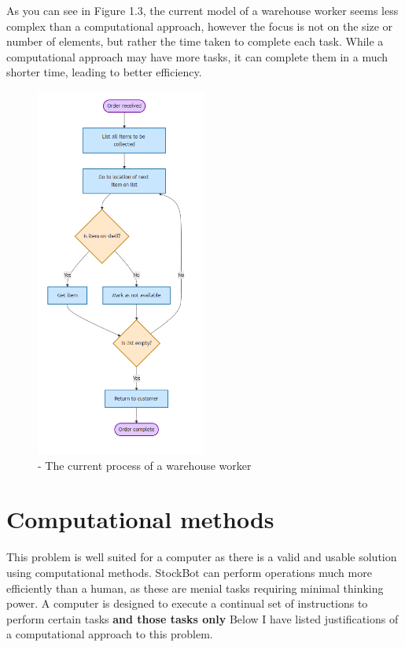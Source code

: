 \newpage

As you can see in Figure 1.3, the current model of a warehouse worker seems less complex than a computational approach, however the focus is not on the size or number of elements, but rather the time taken to complete each task. While a computational approach may have more tasks, it can complete them in a much shorter time, leading to better efficiency.

\begin{figure}[h] 
\centering    
\includegraphics[width=0.5\textwidth]{CurrentSysModel.png}
\caption{- The current process of a warehouse worker}
\label{The current process of a warehouse worker}
\end{figure}

\newpage

\section{Computational methods}

This problem is well suited for a computer as there is a valid and usable solution using computational methods. StockBot can perform operations much more efficiently than a human, as these are menial tasks requiring minimal thinking power. A computer is designed to execute a continual set of instructions to perform certain tasks \textbf{and those tasks only} Below I have listed justifications of a computational approach to this problem.

